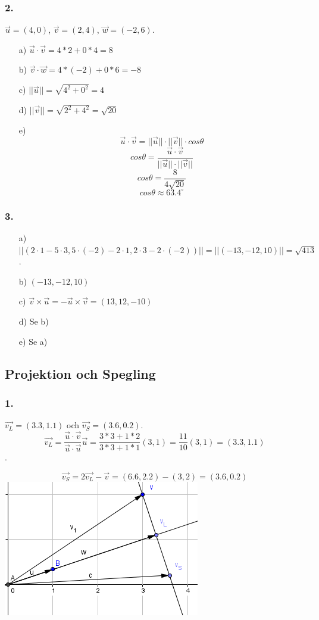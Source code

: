 \documentclass{article}
\begin{document}
\subsubsection*{2.}
$\vec{u} = (4,0)$, $\vec{v} = (2,4)$, $\vec{w} = (-2,6)$.
\begin{itemize}
\item[a) ] $\vec{u} \cdot \vec{v} = 4*2 + 0*4 = 8$  
\item[b) ] $\vec{v} \cdot \vec{w} = 4*(-2) + 0*6 = -8$
\item[c) ] $||\vec{u}|| = \sqrt{4^2 + 0^2} = 4$
\item[d) ] $||\vec{v}|| = \sqrt{2^2 + 4^2} = \sqrt{20}$
\item[e) ] 
\[\vec{u} \cdot \vec{v} = ||\vec{u}|| \cdot ||\vec{v}|| \cdot cos \theta\]
\[cos \theta = \frac{\vec{u} \cdot \vec{v} }{ ||\vec{u}|| \cdot ||\vec{v}|| } \]
\[cos \theta = \frac{ 8 }{ 4 \sqrt{20} } \]
\[cos \theta \approx 63.4^{\circ} \]
\end{itemize}

\subsubsection*{3.}
\begin{itemize}
\item[a) ] $||(2 \cdot 1 - 5 \cdot 3, 5 \cdot (-2) - 2 \cdot 1, 2 \cdot 3 - 2 \cdot (-2))|| 
			= ||(-13, -12, 10)|| = \sqrt{413}$.
\item[b) ] $(-13, -12, 10)$
\item[c) ] $\vec{v} \times \vec{u} = -\vec{u} \times \vec{v} = (13, 12, -10)$
\item[d) ] Se b)
\item[e) ] Se a)
\end{itemize}

\subsection*{Projektion och Spegling}
\subsubsection*{1.}
$\vec{v_L} = (3.3, 1.1)$ och $\vec{v_S} = (3.6, 0.2)$. 
\[\vec{v_L} = \frac{\vec{u} \cdot \vec{v}}{\vec{u} \cdot \vec{u}}\vec{u}
= \frac{3*3+1*2}{3*3+1*1} (3,1) = \frac{11}{10} (3, 1) = (3.3, 1.1)\]. 

\[\vec{v_S} = 2\vec{v_L} - \vec{v} = (6.6, 2.2) - (3, 2) = (3.6, 0.2)\]
\newline  
\includegraphics[scale=0.75]{graph_ans_3}
\end{document}
